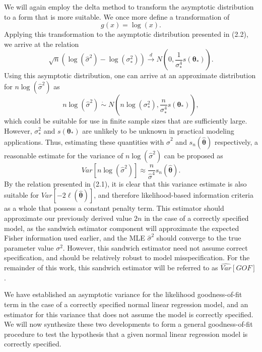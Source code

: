\documentclass[submit]{smj}
\begin{document}
		We will again employ the delta method to transform the asymptotic distribution to a form that is more suitable. We once more define a transformation of
		\begin{equation*}
			g(x) = \log(x) .
		\end{equation*}
		Applying this transformation to the asymptotic distribution presented in (2.2), we arrive at the relation
		\begin{equation*}
			\sqrt{n} ( \log (\hat{\sigma}^2) - \log(\sigma_*^2)) \xrightarrow[]{d} N \left( 0, \frac{1}{\sigma_*^4} s(\bm{\theta}_*) \right) .
		\end{equation*}
		Using this asymptotic distribution, one can arrive at an approximate distribution for $n\log(\hat{\sigma}^2)$ as
		\begin{equation*}
			n\log(\hat{\sigma}^2) \; \dot\sim \; N \left( n\log(\sigma_* ^2), \frac{n}{\sigma_*^4} s(\bm{\theta}_*) \right) ,
		\end{equation*}
		which could be suitable for use in finite sample sizes that are sufficiently large. However, $\sigma_*^2$ and $s(\bm{\theta}_*)$ are unlikely to be unknown in practical modeling
		applications. Thus, estimating these quantities with $\hat{\sigma}^2$ and $s_n(\hat{\bm{\theta}})$ respectively, a reasonable estimate for the variance of $n\log(\hat{\sigma}^2)$ can
		be proposed as
		\begin{equation*}
			Var \left[ n\log(\hat{\sigma}^2) \right] \approx \frac{n}{\hat{\sigma}^4} s_n(\hat{\bm{\theta}}) .
		\end{equation*}
		By the relation presented in (2.1), it is clear that this variance estimate is also suitable for $Var \left[ -2 \ell (\hat{\bm{\theta}}  ) \right]$, and therefore
		likelihood-based information criteria as a whole that possess a constant penalty term. This estimator should approximate our previously derived value $2n$ in the case of a correctly
		specified model, as the sandwich estimator component will approximate the expected Fisher information used earlier, and the MLE $\hat{\sigma}^2$ should converge to the true
		parameter value $\sigma^2$. However, this sandwich estimator need not assume correct specification, and should be relatively robust to model misspecification. For the remainder of this work, this sandwich estimator will be referred to as $\widehat{Var}[GOF]$.

		We have established an asymptotic variance for the likelihood goodness-of-fit term in the case of a correctly specified normal linear regression model, and an
		estimator for this variance that does not assume the model is correctly specified. We will now synthesize these two developments to form a general goodness-of-fit procedure to
		test the hypothesis that a given normal linear regression model is correctly specified.
\end{document}
